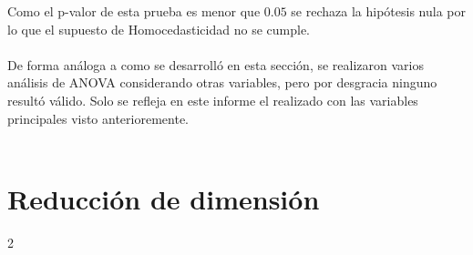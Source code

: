 \documentclass[twoside]{article}
\begin{document}
\begin{multicols}{2}
Como el p-valor de esta prueba es menor que $0.05$ se rechaza la hip\'otesis nula por lo que el supuesto de Homocedasticidad no se cumple.\\\\

De forma an\'aloga a como se desarroll\'o en esta secci\'on, se realizaron varios an\'alisis de ANOVA considerando otras variables, pero por desgracia ninguno result\'o v\'alido. Solo se refleja en este informe el realizado con las variables principales visto anterioremente.\\\\



\section{Reducci\'on de dimensi\'on}

\end{multicols}{2}
\end{document}

